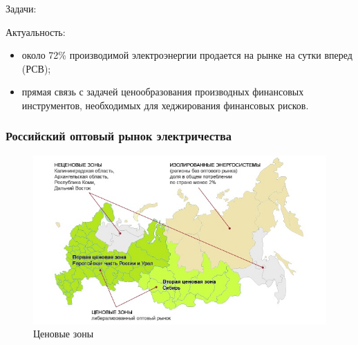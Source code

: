 \documentclass[c, dvipsnames]{beamer}  %
\begin{document}
\begin{frame}[shrink=3]
\begin{block}{Задачи:}
\begin{itemize}

		
	\end{itemize}
	
\end{block}

\begin{block}{Актуальность:}
	\begin{itemize}
		
		\item около 72\% производимой электроэнергии продается на рынке на сутки вперед (РСВ);
		\item прямая связь с задачей ценообразования производных финансовых инструментов, необходимых для хеджирования  финансовых рисков. 
		
		
	\end{itemize}
\end{block}


\end{frame}


\begin{frame}[shrink=5]
\frametitle{Российский оптовый рынок электричества} 

\begin{figure}
	\centering
	\includegraphics[width=0.7\linewidth]{screenshot003}
	\caption{ Ценовые зоны  }
	\label{fig:screenshot003}
\end{figure}

\end{frame}
\end{document}
